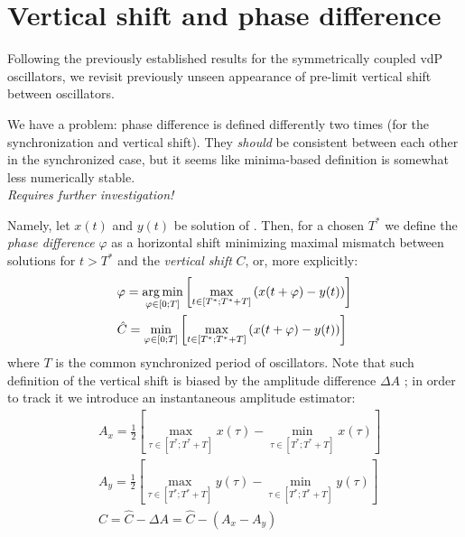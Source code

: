 \documentclass{mynotes}
\begin{document}
\section{ Vertical shift and phase difference }

Following the previously established results for the symmetrically coupled vdP oscillators, we revisit previously unseen appearance of pre-limit vertical shift between oscillators.

\begin{alert}[Inconsistency!]
      We have a problem: phase difference is defined differently two times (for the synchronization and vertical shift). They \textit{should} be consistent between each other in the synchronized case, but it seems like minima-based definition is somewhat less numerically stable. 
      \\[5pt]

      \textit{\color{rwth-red}Requires further investigation!}
\end{alert}

Namely, let \( x(t) \) and \( y(t) \) be solution of . Then, 
for a chosen \( T^* \) we define the \emph{phase difference} \( \varphi \) as a horizontal shift minimizing maximal mismatch between solutions for \( t > T^* \) and the \emph{vertical shift} \( C \), or, more explicitly:
\begin{equation}
      \begin{aligned}
            & \varphi = \operatorname*{arg\,min}_{ \varphi \in [0; T] } \left[ \max_{ t \in [ T^*; T^* + T ] } \left(  x( t + \varphi ) - y( t )  \right) \right] \\
            & \hat C = \min_{ \varphi \in [0; T] } \left[ \max_{ t \in [ T^*; T^* + T ] } \left(  x( t + \varphi ) - y( t )  \right) \right] 
      \end{aligned}
\end{equation}
where \( T \) is the common synchronized period of oscillators. Note that such definition of the vertical shift is biased by the amplitude difference \( \Delta A \) ; in order to track it we introduce an instantaneous amplitude estimator:
\begin{equation}
      \begin{aligned}
            & A_x = \frac{1}{2} \left[ \max_{ \tau \in [T^*; T^* + T ] } x( \tau ) - \min_{ \tau \in [T^*; T^* + T ] } x( \tau ) \right] \\
            & A_y = \frac{1}{2} \left[ \max_{ \tau \in [T^*; T^* + T ] } y( \tau ) - \min_{ \tau \in [T^*; T^* + T ] } y( \tau ) \right] \\
            & C = \hat C - \Delta A = \hat C - \left( A_x - A_y \right)
      \end{aligned}
\end{equation}
\end{document}
